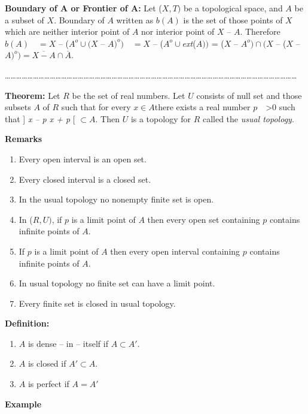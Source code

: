 \documentclass[12pt]{amsart}
\begin{document}
\textbf{Boundary of A or Frontier of A:} Let ($X, T)$ be a topological space, and 
$A$ be a subset of $X$. Boundary of $A$ written as $b(A)$ is the set of those points of 
$X$ which are neither interior point of $A$ nor interior point of $X$ -- $A$. Therefore 
$b (A) \quad = X$ -- ($A^{o}\cup (X$ -- $A)^{o}) \quad = X$ -- ($A^{o}\cup $\textit{ext}($A))$ = ($X$ -- 
$A^{o})\cap (X$ -- ($X$ -- $A)^{o})=\overline {X-A} \cap \overline A $.

{\ldots}{\ldots}{\ldots}{\ldots}{\ldots}{\ldots}{\ldots}{\ldots}{\ldots}{\ldots}{\ldots}{\ldots}{\ldots}{\ldots}{\ldots}{\ldots}{\ldots}{\ldots}{\ldots}{\ldots}{\ldots}{\ldots}{\ldots}{\ldots}{\ldots}{\ldots}{\ldots}{\ldots}{\ldots}{\ldots}{\ldots}{\ldots}{\ldots}{\ldots}{\ldots}{\ldots}{\ldots}{\ldots}{\ldots}{\ldots}{\ldots}{\ldots}{\ldots}{\ldots}{\ldots}{\ldots}{\ldots}{\ldots}{\ldots}{\ldots}{\ldots}{\ldots}

\textbf{Theorem:} Let $R$ be the set of real numbers. Let $U$ consists of null set 
and those subsets $A$ of $R$ such that for every $x \in A $there exists a real number 
$p \quad $>$ 0$ such that ] \textit{x -- p x + p }[ $\subset A$. Then $U$ is a topology for $R$ called the \textit{usual topology}.

\textbf{Remarks}

\begin{enumerate}
\item Every open interval is an open set.
\item Every closed interval is a closed set.
\item In the usual topology no nonempty finite set is open.
\item In ($R, U)$, if $p$ is a limit point of $A$ then every open set containing $p$ contains infinite points of $A$.
\item If $p$ is a limit point of $A$ then every open interval containing $p$ contains infinite points of $A$.
\item In usual topology no finite set can have a limit point.
\item Every finite set is closed in usual topology.
\end{enumerate}
\textbf{Definition: }

\begin{enumerate}
\item $A$ is dense -- in -- itself if $A\subset A'$.
\item $A$ is closed if $A'\subset A$.
\item $A$ is perfect if $A = A'$
\end{enumerate}
\textbf{Example}
\end{document}
